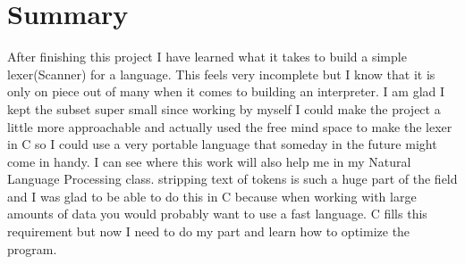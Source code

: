\documentclass{report}
\begin{document}
\section{Summary}
After finishing this project I have learned what it takes to build a simple lexer(Scanner) for a language. 
This feels very incomplete but I know that it is only on piece out of many when it comes to building an interpreter. 
I am glad I kept the subset super small since working by myself I could make the project a little more approachable and actually used the free mind space to make the lexer in C so I could use a very portable language that someday in the future might come in handy. 
I can see where this work will also help me in my Natural Language Processing class. 
stripping text of tokens is such a huge part of the field and I was glad to be able to do this in C because when working with large amounts of data you would probably want to use a fast language. 
C fills this requirement but now I need to do my part and learn how to optimize the program. 
\end{document}
